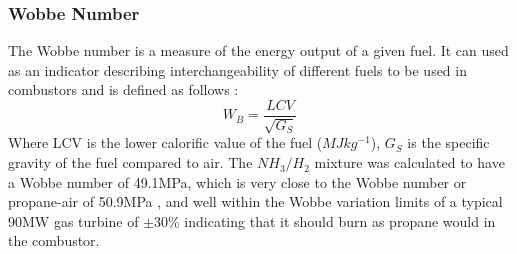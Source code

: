 \documentclass[11pt, oneside]{article}
\begin{document}
\subsubsection{Wobbe Number} 
The Wobbe number is a measure of the energy output of a given fuel. It can used as an indicator describing interchangeability of different fuels to be used in combustors and is defined as follows \cite{website:wobbe}: 
\begin{equation}
W_B = \frac{LCV}{\sqrt{G_S}}
\end{equation}
Where LCV is the lower calorific value of the fuel ($MJ kg^{-1}$), $G_S$ is the specific gravity of the fuel compared to air. The $NH_3/H_2$ mixture was calculated to have a Wobbe number of 49.1MPa, which is very close to the Wobbe number or propane-air of 50.9MPa \cite{website:wobbe}, and well within the Wobbe variation limits of a typical 90MW gas turbine of $\pm 30\%$ \cite{PDF:GE} indicating that it should burn as propane would in the combustor. 
\end{document}

